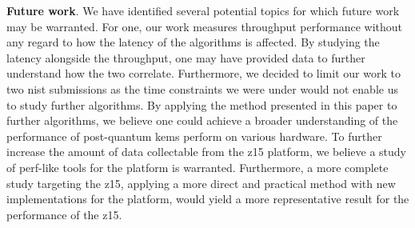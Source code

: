 \textbf{Future work}. We have identified several potential topics for which future work may be warranted. For one, our work measures throughput performance without any regard to how the latency of the algorithms is affected. By studying the latency alongside the throughput, one may have provided data to further understand how the two correlate. Furthermore, we decided to limit our work to two \gls{nist} submissions as the time constraints we were under would not enable us to study further algorithms. By applying the method presented in this paper to further algorithms, we believe one could achieve a broader understanding of the performance of \gls{post-quantum} \glspl{kem} perform on various hardware. To further increase the amount of data collectable from the \gls{z15} platform, we believe a study of perf-like tools for the platform is warranted. Furthermore, a more complete study targeting the \gls{z15}, applying a more direct and practical method with new implementations for the platform, would yield a more representative result for the performance of the \gls{z15}.